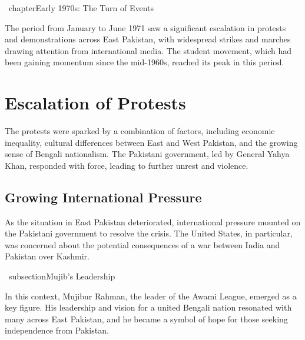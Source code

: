 \ chapter{Early 1970s: The Turn of Events}

The period from January to June 1971 saw a significant escalation in protests and demonstrations across East Pakistan, with widespread strikes and marches drawing attention from international media. The student movement, which had been gaining momentum since the mid-1960s, reached its peak in this period.

\section{Escalation of Protests}

The protests were sparked by a combination of factors, including economic inequality, cultural differences between East and West Pakistan, and the growing sense of Bengali nationalism. The Pakistani government, led by General Yahya Khan, responded with force, leading to further unrest and violence.

\subsection{Growing International Pressure}

As the situation in East Pakistan deteriorated, international pressure mounted on the Pakistani government to resolve the crisis. The United States, in particular, was concerned about the potential consequences of a war between India and Pakistan over Kashmir.

\ subsection{Mujib's Leadership}

In this context, Mujibur Rahman, the leader of the Awami League, emerged as a key figure. His leadership and vision for a united Bengali nation resonated with many across East Pakistan, and he became a symbol of hope for those seeking independence from Pakistan.
